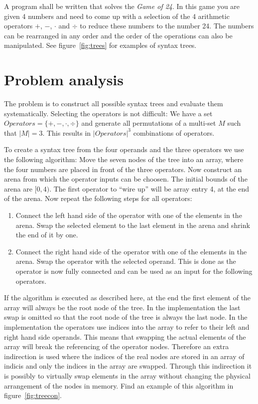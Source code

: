 \documentclass[11pt,a4paper]{article}
\begin{document}
A program shall be written that solves the \textit{Game of 24}.
In this game you are given 4 numbers and need to come up with a
selection of the 4 arithmetic operators $+$, $-$, $\cdot$ and $\div$ to
reduce these numbers to the number 24.
The numbers can be rearranged in any order and the order of the
operations can also be manipulated.
See figure~\ref{fig:trees} for examples of syntax trees.




\section{Problem analysis}
\label{sec:analysis}

The problem is to construct all possible syntax trees and evaluate
them systematically.
Selecting the operators is not difficult:
We have a set $Operators = \{+, -, \cdot, \div\}$ and generate all
permutations of a multi-set $M$ such that $\vert M \vert = 3$.
\newcommand{\complexop}{{\vert Operators \vert}^3}
\newcommand{\opconnect}{4 \cdot 3 \cdot 3 \cdot 2 \cdot 2 \cdot 1}
This results in $\complexop$ combinations of
operators.

To create a syntax tree from the four operands and the three operators
we use the following algorithm:
Move the seven nodes of the tree into an array, where the four
numbers are placed in front of the three operators.
Now construct an arena from which the operator inputs can be
choosen. The initial bounds of the arena are $[0, 4)$.
The first operator to ``wire up'' will be array entry 4, at the end
of the arena.
Now repeat the following steps for all operators:
\begin{enumerate}
  \item Connect the left hand side of the operator with one of the
    elements in the arena. Swap the selected element to the last
    element in the arena and shrink the end of it by one.
  \item Connect the right hand side of the operator with one of the
    elements in the arena. Swap the operator with the selected
    operand. This is done as the operator is now fully connected and
    can be used as an input for the following operators.
\end{enumerate}
If the algorithm is executed as described here, at the end the first
element of the array will always be the root node of the tree. In the
implementation the last swap is omitted so that the root node of the
tree is always the last node.
In the implementation the operators use indices into the array to
refer to their left and right hand side operands. This means that
swapping the actual elements of the array will break the referencing
of the operator nodes.
Therefore an extra indirection is used where the indices of the real
nodes are stored in an array of indicis and only the indices in the
array are swapped.
Through this indirection it is possibly to virtually swap elements in
the array without changing the physical arrangement of the nodes in
memory.
Find an example of this algorithm in figure~\ref{fig:treecon}.
\end{document}
